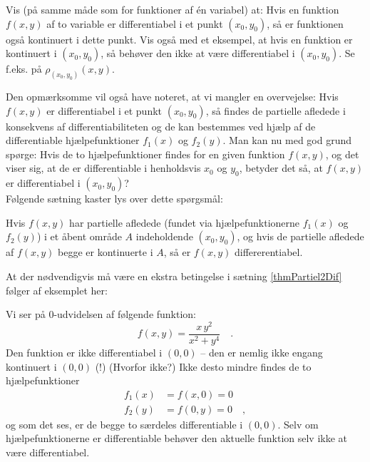 \begin{exercise}
Vis (på samme måde som for funktioner af \'{e}n variabel) at: Hvis en funktion $f(x, y)$ af to variable er differentiabel i et punkt $(x_{0}, y_{0})$, så er funktionen også kontinuert i dette punkt. Vis også med et eksempel, at hvis en funktion er kontinuert i $(x_{0}, y_{0})$, så behøver den ikke at være differentiabel i $(x_{0}, y_{0})$. Se f.eks. på $\rho_{(x_{0}, y_{0})}(x,y)$.
\end{exercise}

Den opmærksomme vil også have noteret, at vi mangler en overvejelse: Hvis $f(x,y)$ er differentiabel i et punkt $(x_{0}, y_{0})$, så findes de partielle afledede
i konsekvens af differentiabiliteten og de kan bestemmes ved hjælp af de differentiable hjælpefunktioner $f_{1}(x)$ og $f_{2}(y)$. Man kan nu med god grund  spørge: Hvis de to hjælpefunktioner findes  for en given funktion $f(x,y)$,  og det viser sig, at de er differentiable i henholdsvis $x_{0}$ og $y_{0}$, betyder det så, at $f(x,y)$ er differentiabel i $(x_{0}, y_{0})$? \\

Følgende sætning kaster lys over dette spørgsmål:

\begin{theorem} \label{thmPartiel2Dif}
Hvis $f(x,y)$ har partielle afledede (fundet via hjælpefunktionerne $f_{1}(x)$ og $f_{2}(y)$)  i et åbent område $A$ indeholdende $(x_{0}, y_{0})$, og hvis de partielle afledede af $f(x,y)$ begge er kontinuerte i $A$, så er $f(x,y)$ differerentiabel.
\end{theorem}

At der nødvendigvis må være en ekstra betingelse i sætning \ref{thmPartiel2Dif} følger af eksemplet her:

\begin{example}
Vi ser på $0$-udvidelsen af følgende funktion:
\begin{equation}
f(x,y) = \frac{x\,y^{2}}{x^{2} + y^{4}} \quad .
\end{equation}
Den funktion er ikke differentiabel i $(0,0)$ -- den er nemlig ikke engang kontinuert i $(0,0)$ (!) (Hvorfor ikke?) Ikke desto mindre findes de to hjælpefunktioner
\begin{equation}
\begin{aligned}
f_{1}(x) &= f(x, 0) = 0 \\
f_{2}(y) &= f(0, y) = 0 \quad,
\end{aligned}
\end{equation}
og som det ses, er de begge to særdeles differentiable i $(0,0)$. Selv om hjælpefunktionerne er differentiable behøver den aktuelle
funktion selv ikke at være differentiabel.
\end{example}




